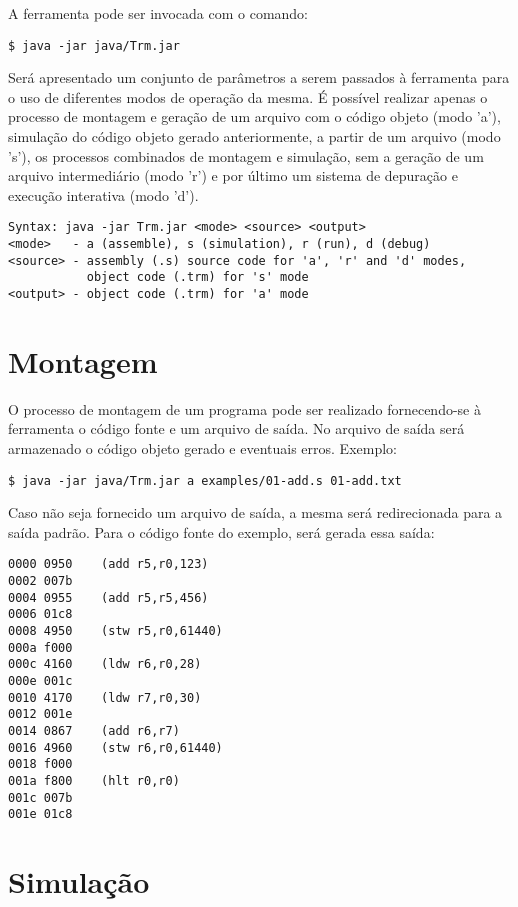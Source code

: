 \documentclass[11pt,a4paper]{report}
\begin{document}
A ferramenta pode ser invocada com o comando:

\begin{verbatim}
$ java -jar java/Trm.jar
\end{verbatim}

Será apresentado um conjunto de parâmetros a serem passados à ferramenta
para o uso de diferentes modos de operação da mesma. É possível realizar
apenas o processo de montagem e geração de um arquivo com o código objeto
(modo 'a'), simulação do código objeto gerado anteriormente, a partir
de um arquivo (modo 's'), os processos combinados de montagem e simulação,
sem a geração de um arquivo intermediário (modo 'r') e por último um
sistema de depuração e execução interativa (modo 'd').

\begin{verbatim}
Syntax: java -jar Trm.jar <mode> <source> <output>
<mode>   - a (assemble), s (simulation), r (run), d (debug)
<source> - assembly (.s) source code for 'a', 'r' and 'd' modes,
           object code (.trm) for 's' mode
<output> - object code (.trm) for 'a' mode

\end{verbatim}

\section{Montagem}

O processo de montagem de um programa pode ser realizado fornecendo-se
à ferramenta o código fonte e um arquivo de saída. No arquivo de saída
será armazenado o código objeto gerado e eventuais erros. Exemplo:

\begin{verbatim}
$ java -jar java/Trm.jar a examples/01-add.s 01-add.txt
\end{verbatim}

Caso não seja fornecido um arquivo de saída, a mesma será redirecionada
para a saída padrão. Para o código fonte do exemplo, será gerada essa
saída:

\begin{verbatim}
0000 0950    (add r5,r0,123)
0002 007b
0004 0955    (add r5,r5,456)
0006 01c8
0008 4950    (stw r5,r0,61440)
000a f000
000c 4160    (ldw r6,r0,28)
000e 001c
0010 4170    (ldw r7,r0,30)
0012 001e
0014 0867    (add r6,r7)
0016 4960    (stw r6,r0,61440)
0018 f000
001a f800    (hlt r0,r0)
001c 007b
001e 01c8
\end{verbatim}

\section{Simulação}
\end{document}
